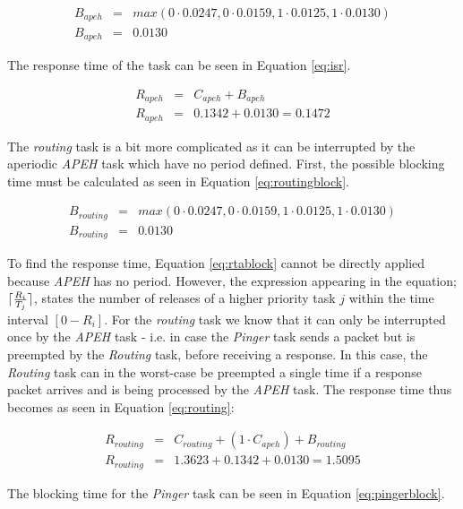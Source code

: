 \begin{eqnarray}
\label{eq:isrblock}
     B_{apeh} &=& max(0 \cdot 0.0247, 0 \cdot 0.0159, 1 \cdot 0.0125, 1 \cdot 0.0130) \nonumber \\
     B_{apeh} &=& 0.0130
\end{eqnarray}

The response time of the task can be seen in Equation \ref{eq:isr}.

\begin{eqnarray}
\label{eq:isr}
      R_{apeh} &=& C_{apeh} + B_{apeh} \nonumber \\
      R_{apeh} &=& 0.1342 + 0.0130 = 0.1472
\end{eqnarray}

The \textit{routing} task is a bit more complicated as it can be interrupted by the aperiodic \textit{APEH} task which have no period defined. First, the possible blocking time must be calculated as seen in Equation \ref{eq:routingblock}.

\begin{eqnarray}
\label{eq:routingblock}
     B_{routing} &=& max(0 \cdot 0.0247, 0 \cdot 0.0159, 1 \cdot 0.0125, 1 \cdot 0.0130) \nonumber \\
     B_{routing} &=& 0.0130
\end{eqnarray}

To find the response time, Equation \ref{eq:rtablock} cannot be directly applied because \textit{APEH} has no period. However, the expression appearing in the equation; $\lceil\frac{R_{i}}{T_{j}}\rceil$, states the number of releases of a higher priority task $j$ within the time interval $[0-R_{i}]$. For the \textit{routing} task we know that it can only be interrupted once by the \textit{APEH} task - i.e. in case the \textit{Pinger} task sends a packet but is preempted by the \textit{Routing} task, before receiving a response. In this case, the \textit{Routing} task can in the worst-case be preempted a single time if a response packet arrives and is being processed by the \textit{APEH} task. The response time thus becomes as seen in Equation \ref{eq:routing}:

\begin{eqnarray}
\label{eq:routing}
      R_{routing} &=& C_{routing} + (1 \cdot C_{apeh}) + B_{routing} \nonumber \\
      R_{routing} &=& 1.3623 + 0.1342 + 0.0130 = 1.5095
\end{eqnarray}

The blocking time for the \textit{Pinger} task can be seen in Equation \ref{eq:pingerblock}.

